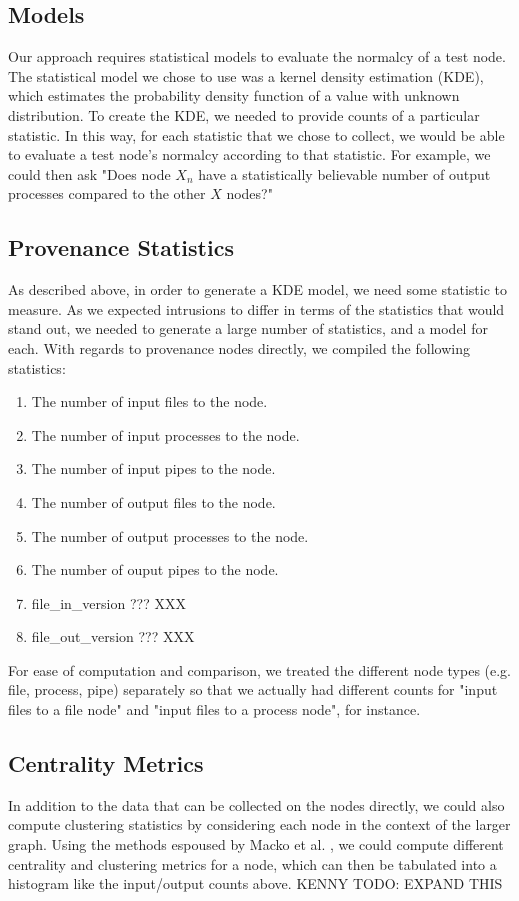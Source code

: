 \documentclass[10pt,twocolumn]{article}
\begin{document}
\subsection{Models}
Our approach requires statistical models to evaluate the normalcy of a test node. The statistical model we chose to use was a kernel density estimation (KDE), which estimates the probability density function of a value with unknown distribution. To create the KDE, we needed to provide counts of a particular statistic. In this way, for each statistic that we chose to collect, we would be able to evaluate a test node's normalcy according to that statistic. For example, we could then ask "Does node $X_n$ have a statistically believable number of output processes compared to the other $X$ nodes?"
\subsection{Provenance Statistics}
As described above, in order to generate a KDE model, we need some statistic to measure. As we expected intrusions to differ in terms of the statistics that would stand out, we needed to generate a large number of statistics, and a model for each. With regards to provenance nodes directly, we compiled the following statistics:
\begin{enumerate}
\item The number of input files to the node.
\item The number of input processes to the node.
\item The number of input pipes to the node.
\item The number of output files to the node.
\item The number of output processes to the node.
\item The number of ouput pipes to the node.
\item file\_in\_version ??? XXX
\item file\_out\_version ??? XXX
\end{enumerate}
For ease of computation and comparison, we treated the different node types (e.g. file, process, pipe) separately so that we actually had different counts for "input files to a file node" and "input files to a process node", for instance.
\subsection{Centrality Metrics}
In addition to the data that can be collected on the nodes directly, we could also compute clustering statistics by considering each node in the context of the larger graph. Using the methods espoused by Macko et al. \cite{clustering}, we could compute different centrality and clustering metrics for a node, which can then be tabulated into a histogram like the input/output counts above. 
KENNY TODO: EXPAND THIS
\end{document}
